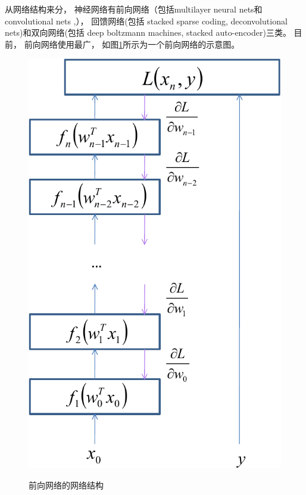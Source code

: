 从网络结构来分， 神经网络有前向网络（包括multilayer neural nets\cite{kuurkova1992kolmogorov,
hornik1989multilayer,hornik1991approximation}和 convolutional nets \cite{lecun1995convolutional,krizhevsky2012imagenet},）， 回馈网络(包括 stacked sparse coding\cite{yu2011learning}, deconvolutional nets\cite{zeiler2010deconvolutional})和双向网络(包括 deep boltzmann machines\cite{salakhutdinov2009deep,
srivastava2012multimodal,goodfellow2013multi}, stacked auto-encoder\cite{gehring2013extracting,vincent2010stacked,vincent2008extracting})三类\cite{lecun2013deep}。 目前， 前向网络使用最广， 如图\ref{fig:feed_forward}所示为一个前向网络的示意图。 

\begin{figure}[htb]
  \centering
  \includegraphics[scale=0.7]{Pictures/CNN/feed-forward-crop.pdf}\\
  \caption{前向网络的网络结构}\label{fig:feed_forward}
\end{figure}

